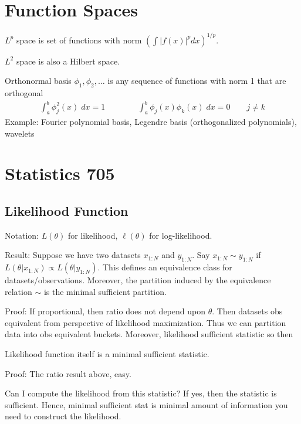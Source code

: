 \documentclass[12pt]{article}
\theoremstyle{plain}
\theoremstyle{definition}
\theoremstyle{remark}
\begin{document}
\clearpage
\section{Function Spaces}


$L^p$ space is set of functions with norm
$\left(\int |f(x)|^p dx\right)^{1/p}$.

$L^2$ space is also a Hilbert space.

Orthonormal basis $\phi_1,\phi_2,\ldots$ is any sequence of functions
with norm 1 that are orthogonal
\begin{align*}
  \int^b_a \phi_j^2(x)\;dx=1
  \qquad
  \qquad
  \int^b_a \phi_j(x)\phi_k(x)\;dx=0
  \qquad
  j\neq k
\end{align*}
Example: Fourier polynomial basis, Legendre basis (orthogonalized
polynomials), wavelets




\clearpage
\section{Statistics 705}







\subsection{Likelihood Function}

Notation: $L(\theta)$ for likelihood, $\ell(\theta)$ for log-likelihood.

Result:
Suppose we have two datasets $x_{1:N}$ and $y_{1:N}$.
Say $x_{1:N}\sim y_{1:N}$ if
$L(\theta|x_{1:N})\propto L(\theta|y_{1:N})$.
This defines an equivalence class for datasets/observations.
Moreover, the partition induced by the equivalence relation $\sim$ is
the minimal sufficient partition.

Proof:
If proportional, then ratio does not depend upon $\theta$.
Then datasets obs equivalent from perspective of likelihood
maximization.
Thus we can partition data into obs equivalent buckets.
Moreover, likelihood sufficient statistic so then

Likelihood function itself is a minimal sufficient statistic.

Proof:
The ratio result above, easy.

Can I compute the likelihood from this statistic? If yes, then the
statistic is sufficient.
Hence, minimal sufficient stat is minimal amount of information you need
to construct the likelihood.
\end{document}
